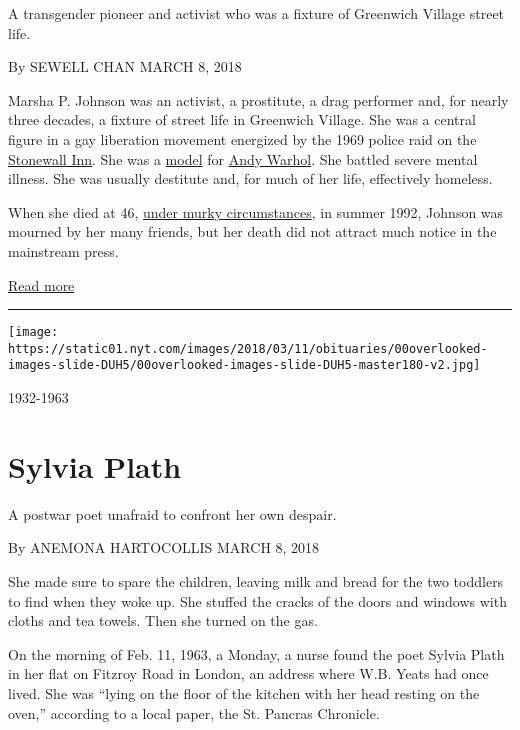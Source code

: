 A transgender pioneer and activist who was a fixture of Greenwich
Village street life.

By SEWELL CHAN MARCH 8, 2018

Marsha P. Johnson was an activist, a prostitute, a drag performer and,
for nearly three decades, a fixture of street life in Greenwich Village.
She was a central figure in a gay liberation movement energized by the
1969 police raid on the
\href{https://www.nytimes.com/2016/06/25/nyregion/stonewall-inn-named-national-monument-a-first-for-gay-rights-movement.html}{Stonewall
Inn}. She was a
\href{https://onlineonly.christies.com/s/andy-warhol-christies-andys-eye-candy/ladies-gentlemen-marsha-johnson-98/6817}{model}
for
\href{http://www.nytimes.com/1987/02/23/obituaries/andy-warhol-pop-artist-dies.html}{Andy
Warhol}. She battled severe mental illness. She was usually destitute
and, for much of her life, effectively homeless.

When she died at 46,
\href{https://www.nytimes.com/2017/10/05/movies/the-death-and-life-of-marsha-p-johnson-review.html}{under
murky circumstances}, in summer 1992, Johnson was mourned by her many
friends, but her death did not attract much notice in the mainstream
press.

\href{https://www.nytimes.com/interactive/2018/obituaries/overlooked-marsha-p-johnson.html}{Read
more}

\begin{center}\rule{0.5\linewidth}{\linethickness}\end{center}

\texttt{[image: https://static01.nyt.com/images/2018/03/11/obituaries/00overlooked-images-slide-DUH5/00overlooked-images-slide-DUH5-master180-v2.jpg]}

1932-1963

\hypertarget{sylvia-plath}{%
\section{Sylvia Plath}\label{sylvia-plath}}

A postwar poet unafraid to confront her own despair.

By ANEMONA HARTOCOLLIS MARCH 8, 2018

She made sure to spare the children, leaving milk and bread for the two
toddlers to find when they woke up. She stuffed the cracks of the doors
and windows with cloths and tea towels. Then she turned on the gas.

On the morning of Feb. 11, 1963, a Monday, a nurse found the poet Sylvia
Plath in her flat on Fitzroy Road in London, an address where W.B. Yeats
had once lived. She was ``lying on the floor of the kitchen with her
head resting on the oven,'' according to a local paper, the St. Pancras
Chronicle.

